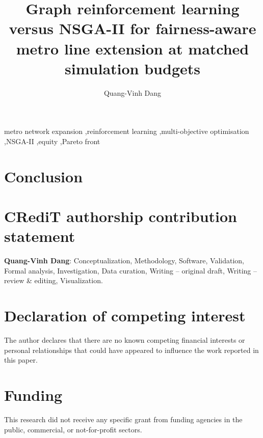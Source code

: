 \documentclass[preprint,12pt,authoryear]{elsarticle}
\begin{document}
\begin{frontmatter}

\title{Graph reinforcement learning versus NSGA-II for fairness-aware metro line extension at matched simulation budgets}

\author[bu]{Quang-Vinh Dang}

\begin{abstract}

\end{abstract}

\begin{keyword}
metro network expansion \sep reinforcement learning \sep multi-objective optimisation \sep NSGA-II \sep equity \sep Pareto front
\end{keyword}

\end{frontmatter}









\section{Conclusion}\label{sec:conclusion}


\section*{CRediT authorship contribution statement}
\textbf{Quang-Vinh Dang}: Conceptualization, Methodology, Software, Validation, Formal analysis, Investigation, Data curation, Writing -- original draft, Writing -- review \& editing, Visualization.

\section*{Declaration of competing interest}
The author declares that there are no known competing financial interests or personal relationships that could have appeared to influence the work reported in this paper.

\section*{Funding}
This research did not receive any specific grant from funding agencies in the public, commercial, or not-for-profit sectors.
\end{document}
